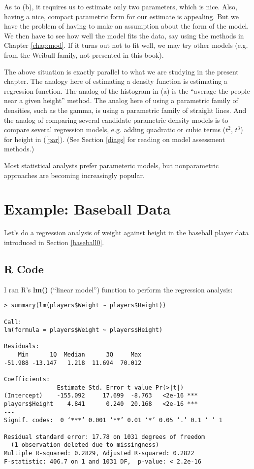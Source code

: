 As to (b), it requires us to estimate only two parameters, which is
nice.  Also, having a nice, compact parametric form for our estimate is
appealing.  But we have the problem of having to make an assumption
about the form of the model.  We then have to see how well the model
fits the data, say using the methods in Chapter \ref{chap:mod}.  If it
turns out not to fit well, we may try other models (e.g. from the
Weibull family, not presented in this book).

The above situation is exactly parallel to what we are studying in the
present chapter.  The analogy here of estimating a density function is
estimating a regression function.  The analog of the histogram in (a) is
the ``average the people near a given height'' method.  The analog here
of using a parametric family of densities, such as the gamma, is using a
parametric family of straight lines.  And the analog of comparing
several candidate parametric density models is to compare several
regression models, e.g. adding quadratic or cubic terms ($t^2$, $t^3$)
for height in (\ref{par}).  (See Section \ref{diags} for reading on
model assessment methods.)

Most statistical analysts prefer parameteric models, but nonparametric
approaches are becoming increasingly popular.

\section{Example:  Baseball Data}
\label{baseball1}

Let's do a regression analysis of weight against height in the baseball
player data introduced in Section \ref{baseball0}.

\subsection{R Code}

I ran R's {\bf lm()} (``linear model'') function to perform the
regression analysis:

\begin{verbatim}
> summary(lm(players$Weight ~ players$Height))

Call:
lm(formula = players$Weight ~ players$Height)

Residuals:
    Min      1Q  Median      3Q     Max 
-51.988 -13.147   1.218  11.694  70.012 

Coefficients:
               Estimate Std. Error t value Pr(>|t|)    
(Intercept)    -155.092     17.699  -8.763   <2e-16 ***
players$Height    4.841      0.240  20.168   <2e-16 ***
---
Signif. codes:  0 ‘***’ 0.001 ‘**’ 0.01 ‘*’ 0.05 ‘.’ 0.1 ‘ ’ 1 

Residual standard error: 17.78 on 1031 degrees of freedom
  (1 observation deleted due to missingness)
Multiple R-squared: 0.2829,	Adjusted R-squared: 0.2822 
F-statistic: 406.7 on 1 and 1031 DF,  p-value: < 2.2e-16 
\end{verbatim}

